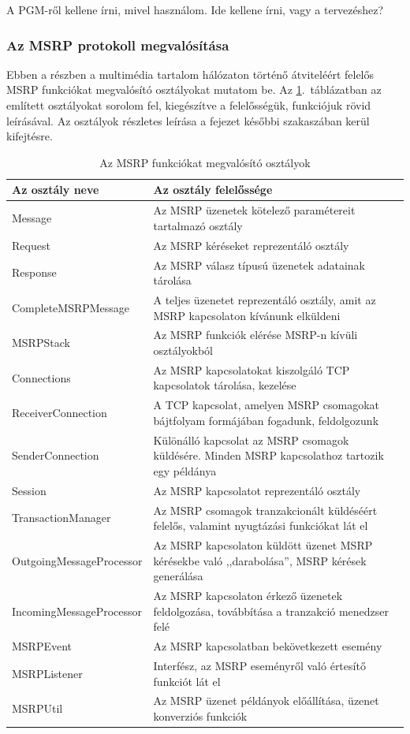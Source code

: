 {\color{red}A PGM-ről kellene írni, mivel használom. Ide kellene írni, vagy a tervezéshez?}

\subsubsection{Az MSRP protokoll megvalósítása}

Ebben a részben a multimédia tartalom hálózaton történő átviteléért felelős MSRP funkciókat megvalósító osztályokat mutatom be. Az \ref{tab:msrp_classes}.~táblázatban az említett osztályokat sorolom fel, kiegészítve a felelősségük, funkciójuk rövid leírásával. Az osztályok részletes leírása a fejezet későbbi szakaszában kerül kifejtésre.

\begin{table}[htb]
\center
\begin{tabular}{|l | p{9cm} |}
\hline
{\bf Az osztály neve} & {\bf Az osztály felelőssége}\\
\hline
\hline
Message & Az MSRP üzenetek kötelező paramétereit tartalmazó osztály\\ \hline
Request & Az MSRP kéréseket reprezentáló osztály\\ \hline
Response & Az MSRP válasz típusú üzenetek adatainak tárolása\\ \hline
CompleteMSRPMessage & A teljes üzenetet reprezentáló osztály, amit az MSRP kapcsolaton kívánunk elküldeni\\ \hline
MSRPStack & Az MSRP funkciók elérése MSRP-n kívüli osztályokból\\ \hline
Connections & Az MSRP kapcsolatokat kiszolgáló TCP kapcsolatok tárolása, kezelése\\ \hline
ReceiverConnection & A TCP kapcsolat, amelyen MSRP csomagokat bájtfolyam formájában fogadunk, feldolgozunk\\ \hline
SenderConnection & Különálló kapcsolat az MSRP csomagok küldésére. Minden MSRP kapcsolathoz tartozik egy példánya\\ \hline
Session & Az MSRP kapcsolatot reprezentáló osztály\\
TransactionManager & Az MSRP csomagok tranzakcionált küldéséért felelős, valamint nyugtázási funkciókat lát el\\ \hline
OutgoingMessageProcessor & Az MSRP kapcsolaton küldött üzenet MSRP kérésekbe való ,,darabolása'', MSRP kérések generálása\\ \hline
IncomingMessageProcessor & Az MSRP kapcsolaton érkező üzenetek feldolgozása, továbbítása a tranzakció menedzser felé\\ \hline
MSRPEvent & Az MSRP kapcsolatban bekövetkezett esemény\\ \hline
MSRPListener & Interfész, az MSRP eseményről való értesítő funkciót lát el\\ \hline
MSRPUtil & Az MSRP üzenet példányok előállítása, üzenet konverziós funkciók\\ \hline
\hline
\end{tabular}
\caption{Az MSRP funkciókat megvalósító osztályok}
\label{tab:msrp_classes}
\end{table}

